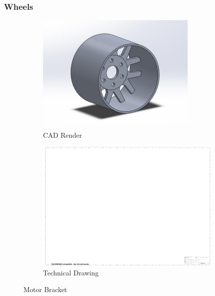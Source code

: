 \subsubsection{Wheels}
\begin{figure}[ht!]
  \centering
  \begin{subfigure}{.5\textwidth}
    \centering
    \includegraphics[width=\linewidth]{texfiles/mech/eimg/propulsion/picture_wheel}
    \caption{CAD Render}
    \label{fig:CAD Motorshaft}
  \end{subfigure}%
  \begin{subfigure}{.5\textwidth}
    \centering
    \includegraphics[width=\linewidth]{texfiles/mech/eimg/propulsion/spaceholder_technical_drawing}
    \caption{Technical Drawing}
    \label{fig:TD Motorshaft}
  \end{subfigure}
  \caption{Motor Bracket}
  \label{fig:Motorshaft}
 
\end{figure}

